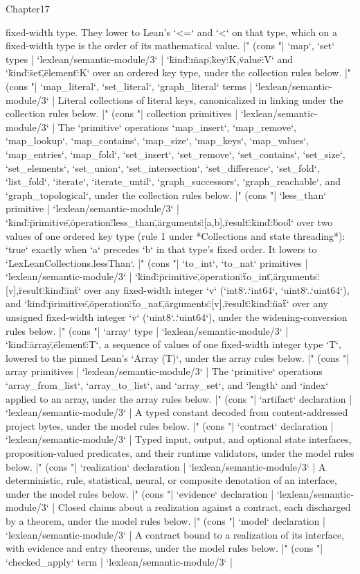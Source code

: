 \begin{lexlean}{Chapter17}
\begin{semanticmodule}
{{fixed-width type. They lower to Lean's `<=` and `<` on that type, which on a fixed-width type is the order of its mathematical value. |" (cons "| `map`, `set` types | `lexlean/semantic-module/3` | `{\"kind\":\"map\",\"key\":K,\"value\":V}` and `{\"kind\":\"set\",\"element\":K}` over an ordered key type, under the collection rules below. |" (cons "| `map_literal`, `set_literal`, `graph_literal` terms | `lexlean/semantic-module/3` | Literal collections of literal keys, canonicalized in linking under the collection rules below. |" (cons "| collection primitives | `lexlean/semantic-module/3` | The `primitive` operations `map_insert`, `map_remove`, `map_lookup`, `map_contains`, `map_size`, `map_keys`, `map_values`, `map_entries`, `map_fold`, `set_insert`, `set_remove`, `set_contains`, `set_size`, `set_elements`, `set_union`, `set_intersection`, `set_difference`, `set_fold`, `list_fold`, `iterate`, `iterate_until`, `graph_successors`, `graph_reachable`, and `graph_topological`, under the collection rules below. |" (cons "| `less_than` primitive | `lexlean/semantic-module/3` | `{\"kind\":\"primitive\",\"operation\":\"less_than\",\"arguments\":[a,b],\"result\":{\"kind\":\"bool\"}}` over two values of one ordered key type (rule 1 under *Collections and state threading*): `true` exactly when `a` precedes `b` in that type's fixed order. It lowers to `LexLeanCollections.lessThan`. |" (cons "| `to_int`, `to_nat` primitives | `lexlean/semantic-module/3` | `{\"kind\":\"primitive\",\"operation\":\"to_int\",\"arguments\":[v],\"result\":{\"kind\":\"int\"}}` over any fixed-width integer `v` (`int8`..`int64`, `uint8`..`uint64`), and `{\"kind\":\"primitive\",\"operation\":\"to_nat\",\"arguments\":[v],\"result\":{\"kind\":\"nat\"}}` over any unsigned fixed-width integer `v` (`uint8`..`uint64`), under the widening-conversion rules below. |" (cons "| `array` type | `lexlean/semantic-module/3` | `{\"kind\":\"array\",\"element\":T}`, a sequence of values of one fixed-width integer type `T`, lowered to the pinned Lean's `Array (T)`, under the array rules below. |" (cons "| array primitives | `lexlean/semantic-module/3` | The `primitive` operations `array_from_list`, `array_to_list`, and `array_set`, and `length` and `index` applied to an array, under the array rules below. |" (cons "| `artifact` declaration | `lexlean/semantic-module/3` | A typed constant decoded from content-addressed project bytes, under the model rules below. |" (cons "| `contract` declaration | `lexlean/semantic-module/3` | Typed input, output, and optional state interfaces, proposition-valued predicates, and their runtime validators, under the model rules below. |" (cons "| `realization` declaration | `lexlean/semantic-module/3` | A deterministic, rule, statistical, neural, or composite denotation of an interface, under the model rules below. |" (cons "| `evidence` declaration | `lexlean/semantic-module/3` | Closed claims about a realization against a contract, each discharged by a theorem, under the model rules below. |" (cons "| `model` declaration | `lexlean/semantic-module/3` | A contract bound to a realization of its interface, with evidence and entry theorems, under the model rules below. |" (cons "| `checked_apply` term | `lexlean/semantic-module/3` | }}
\end{semanticmodule}
\end{lexlean}
